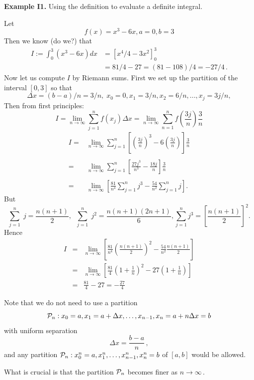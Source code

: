 \documentclass{article}
\begin{document}
\textbf{Example I1.} Using the definition to evaluate a definite integral.

Let 
$$
f(x) = x^3 - 6x, a=0, b=3
$$
Then we know (do we?) that
$$
\begin{array}{ll}
I:= \displaystyle\int_0^3 (x^3- 6x) dx & =\left[ x^4/4-3x^2 \right]_0^3\\
& =81/4-27=(81-108)/4= -27/4\,.
\end{array}
$$
Now let us compute $I$ by Riemann sums. First we set up the partition of the interval $[0, 3]$ so that
$$
\Delta x= (b-a)/n= 3/n, \; x_0=0, x_1=3/n, x_2=6/n, ..., x_j=3j/n,
$$
Then from first principles:
$$
I = \lim_{n \to \infty} \sum_{j=1}^{n } f(x_j) \Delta x =  \lim_{n \to \infty}\sum_{n=1}^{n} f(\frac{3j}{n})
  \frac{3}{n}  
$$
$$
\begin{array}{ll}
I = & \displaystyle\lim_{n \to \infty}  \sum_{j=1}^{n} \left[ \left(\frac{3j}{n}\right)^3-6 \left(\frac{3j}{n}\right) \right] \frac{3}{n}  \\
\\
= & \displaystyle \lim_{n \to \infty} \sum_{j=1}^{n} \left[ \frac{27j^3}{n^3} -\frac{18j}{n} \right] \frac{3}{n} \\
\\
= & \displaystyle \lim_{n \to \infty} \left[ \frac{81}{n^4}  \sum_{j=1}^{n} j^3 - \frac{54}{n^2} \sum_{j=1}^{n} j \right].
\end{array}
$$
But
$$
\sum_{j=1}^{n} \; j= \frac{n(n+1)}{2}, \;\; 
\sum_{j=1}^{n} \; j^2= \frac{n(n+1)(2n+1)}{6},
\sum_{j=1}^{n}j^3= \left[ \frac{n(n+1)}{2} \right]^2.
$$
Hence
\begin{eqnarray}
 I & = & \lim_{n \to \infty} \left[ \frac{81}{n^4}\left(
\frac{n(n+1)}{2} \right)^2   - \frac{54}{n^2} \frac{n(n+1)}{2}
\right]  \nonumber \\
  & = & \lim_{n \to \infty} \left[ \frac{81}{4}\left( 1+
\frac{1}{n} \right)^2   - 27 \left( 1+ \frac{1}{n} \right) \right]
 \nonumber \\
 & = &  \frac{81}{4}-27=  - \frac{27}{4} \nonumber
\end{eqnarray}
\hrulefill

Note that we do not need to use a partition 
$$
{\cal P}_n: x_0=a, x_1= a + \Delta x, \ldots, x_{n-1}, x_n = a+ n \Delta x= b
$$ 
with uniform separation 
$$
\Delta x = \frac{b-a}{n}\,,
$$
and any partition ${\cal P}_n: x_0^n=a, x_1^n, \ldots, x_{n-1}^n, x_n^n = b$ of $[a, b]$ would be allowed.

What is crucial is that the partition ${\cal P}_n$ becomes finer as $n \rightarrow \infty$\,.
\end{document}
